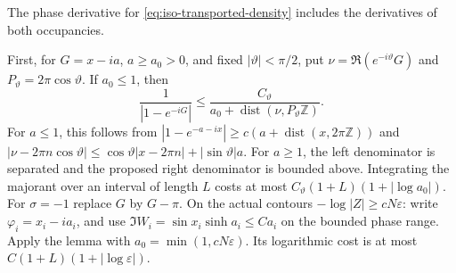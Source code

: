 \documentclass[11pt]{article}
\numberwithin{equation}{section}
\theoremstyle{definition}
\newcommand{\eps}{\varepsilon}
\begin{document}
The phase derivative for \eqref{eq:iso-transported-density} includes
the derivatives of both occupancies.

First, for $G=x-ia$, $a\ge a_0>0$, and fixed
$|\vartheta|<\pi/2$, put $\nu=\Re(e^{-i\vartheta}G)$ and
$P_\vartheta=2\pi\cos\vartheta$.  If $a_0\le1$, then
\begin{equation}\label{eq:iso-oblique-kernel}
 \frac1{|1-e^{-iG}|}
 \le\frac{C_\vartheta}
 {a_0+\operatorname{dist}(\nu,P_\vartheta\mathbb Z)}.
\end{equation}
For $a\le1$, this follows from
$|1-e^{-a-ix}|\ge c(a+\operatorname{dist}(x,2\pi\mathbb Z))$
and
$|\nu-2\pi n\cos\vartheta|\le
 \cos\vartheta|x-2\pi n|+|\sin\vartheta|a$.
For $a\ge1$, the left denominator is separated and the proposed
right denominator is bounded above.  Integrating the majorant over
an interval of length $L$ costs at most
$C_\vartheta(1+L)(1+|\log a_0|)$.  For $\sigma=-1$ replace $G$
by $G-\pi$.  On the actual contours $-\log|Z|\ge cN\eps$:
write $\varphi_i=x_i-ia_i$, and use
$\Im W_i=\sin x_i\sinh a_i\le Ca_i$ on the bounded phase range.
Apply the lemma with $a_0=\min(1,cN\eps)$.  Its logarithmic cost is
at most $C(1+L)(1+|\log\eps|)$.
\end{document}
